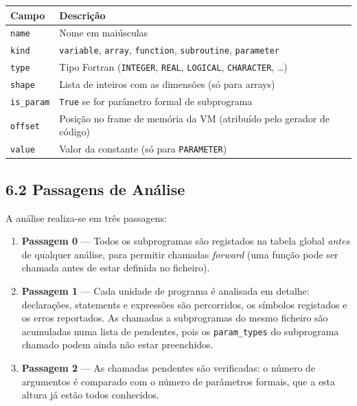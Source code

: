 \documentclass[a4paper]{article}
\begin{document}
\begin{center}
\begin{tabular}{ll}
\toprule
\textbf{Campo} & \textbf{Descrição} \\
\midrule
\texttt{name}        & Nome em maiúsculas \\
\texttt{kind}        & \texttt{variable}, \texttt{array}, \texttt{function}, \texttt{subroutine}, \texttt{parameter} \\
\texttt{type}        & Tipo Fortran (\texttt{INTEGER}, \texttt{REAL}, \texttt{LOGICAL}, \texttt{CHARACTER}, \ldots) \\
\texttt{shape}       & Lista de inteiros com as dimensões (só para arrays) \\
\texttt{is\_param}   & \texttt{True} se for parâmetro formal de subprograma \\
\texttt{offset}      & Posição no frame de memória da VM (atribuído pelo gerador de código) \\
\texttt{value}       & Valor da constante (só para \texttt{PARAMETER}) \\
\bottomrule
\end{tabular}
\end{center}

\subsection*{6.2 Passagens de Análise}

\noindent A análise realiza-se em três passagens:

\begin{enumerate}
    \item \textbf{Passagem 0} --- Todos os subprogramas são registados na tabela global \textit{antes} de qualquer análise, para permitir chamadas \textit{forward} (uma função pode ser chamada antes de estar definida no ficheiro).
    \item \textbf{Passagem 1} --- Cada unidade de programa é analisada em detalhe: declarações, statements e expressões são percorridos, os símbolos registados e os erros reportados. As chamadas a subprogramas do mesmo ficheiro são acumuladas numa lista de pendentes, pois os \texttt{param\_types} do subprograma chamado podem ainda não estar preenchidos.
    \item \textbf{Passagem 2} --- As chamadas pendentes são verificadas: o número de argumentos é comparado com o número de parâmetros formais, que a esta altura já estão todos conhecidos.
\end{enumerate}
\end{document}

